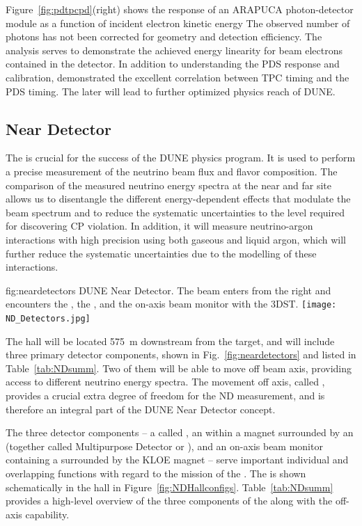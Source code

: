 Figure~\ref{fig:pdtpcpd}(right) shows the response of an ARAPUCA photon-detector module as a function of incident electron kinetic energy
The observed number of photons has not been corrected for geometry and detection efficiency. The analysis serves to demonstrate the achieved energy linearity for beam electrons contained in the detector.  
In addition to understanding the PDS response and calibration,  demonstrated the excellent correlation between TPC timing and the PDS timing. The later will lead to further optimized physics reach of DUNE. 


\subsection{Near Detector}
\label{sec:nd-verview}

The   is crucial for the success of the DUNE physics program. It is used to perform a precise measurement of the neutrino beam flux and flavor composition. The comparison of the measured neutrino energy spectra at the near and far site allows us to disentangle the different energy-dependent effects that modulate the beam spectrum and to reduce the systematic uncertainties to the level required for discovering CP violation. In addition, it will measure neutrino-argon interactions with high precision using both gaseous and liquid argon, which will further reduce the systematic uncertainties due to the modelling of these interactions.

\begin{dunefigure}
{fig:neardetectors}
{DUNE Near Detector. The beam enters from the right and encounters
the , the , and the on-axis beam monitor with the 3DST.}
\texttt{[image: ND\_Detectors.jpg]}
\end{dunefigure}


The  hall will be located \SI{575}{m} downstream from the target, and will include three primary detector components, shown in Fig.~\ref{fig:neardetectors}  and listed in Table~\ref{tab:NDsumm}. Two of them will be able to move off beam axis, providing access to different neutrino energy spectra. The movement off axis, called , provides a crucial extra degree of freedom for the ND measurement, and is therefore an integral part of the DUNE Near Detector concept. 

The three detector components -- a  called , an  within a magnet surrounded by an  (together called Multipurpose Detector or ), and an on-axis beam monitor containing a  surrounded by the KLOE magnet -- serve important individual and overlapping functions with regard to the mission of the . 
The   is shown schematically in the   hall in Figure~\ref{fig:NDHallconfigs}.  Table~\ref{tab:NDsumm} provides a high-level overview of the three components of the   along with the off-axis capability.  

